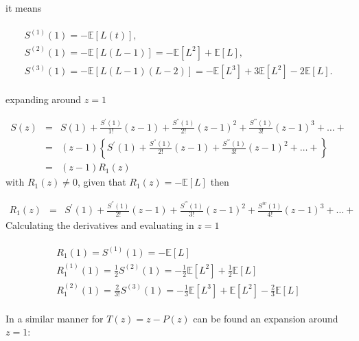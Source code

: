 \documentclass{article}
\newcommand{\esp}{\mathbb{E}}
\begin{document}
it means

\begin{eqnarray}
\begin{array}{l}
S^{(1)}\left(1\right)=-\esp\left[L\left(t\right)\right],\\ S^{(2)}\left(1\right)=-\esp\left[L\left(L-1\right)\right]
=-\esp\left[L^{2}\right]+\esp\left[L\right],\\
S^{(3)}\left(1\right)=-\esp\left[L\left(L-1\right)\left(L-2\right)\right]
=-\esp\left[L^{3}\right]+3\esp\left[L^{2}\right]-2\esp\left[L\right].
\end{array}
\end{eqnarray}


expanding around $z=1$

\begin{eqnarray*}
S\left(z\right)&=&S\left(1\right)+\frac{S^{'}\left(1\right)}{1!}\left(z-1\right)+\frac{S^{''}\left(1\right)}{2!}\left(z-1\right)^{2}+\frac{S^{'''}\left(1\right)}{3!}\left(z-1\right)^{3}+\ldots+\\
&=&\left(z-1\right)\left\{S^{'}\left(1\right)+\frac{S^{''}\left(1\right)}{2!}\left(z-1\right)+\frac{S^{'''}\left(1\right)}{3!}\left(z-1\right)^{2}+\ldots+\right\}\\
&=&\left(z-1\right)R_{1}\left(z\right)
\end{eqnarray*}
with $R_{1}\left(z\right)\neq0$, given that $R_{1}\left(z\right)=-\esp\left[L\right]$ then

\begin{eqnarray}
R_{1}\left(z\right)&=&S^{'}\left(1\right)+\frac{S^{''}\left(1\right)}{2!}\left(z-1\right)+\frac{S^{'''}\left(1\right)}{3!}\left(z-1\right)^{2}+\frac{S^{iv}\left(1\right)}{4!}\left(z-1\right)^{3}+\ldots+
\end{eqnarray}
Calculating the derivatives and evaluating in $z=1$

\begin{eqnarray}
\begin{array}{l}
R_{1}\left(1\right)=S^{(1)}\left(1\right)=-\esp\left[L\right]\\
R_{1}^{(1)}\left(1\right)=\frac{1}{2}S^{(2)}\left(1\right)=-\frac{1}{2}\esp\left[L^{2}\right]+\frac{1}{2}\esp\left[L\right]\\
R_{1}^{(2)}\left(1\right)=\frac{2}{3!}S^{(3)}\left(1\right)
=-\frac{1}{3}\esp\left[L^{3}\right]+\esp\left[L^{2}\right]-\frac{2}{3}\esp\left[L\right]
\end{array}
\end{eqnarray}

In a similar manner for $T\left(z\right)=z-P\left(z\right)$ can be found an expansion around $z=1$:
\end{document}
